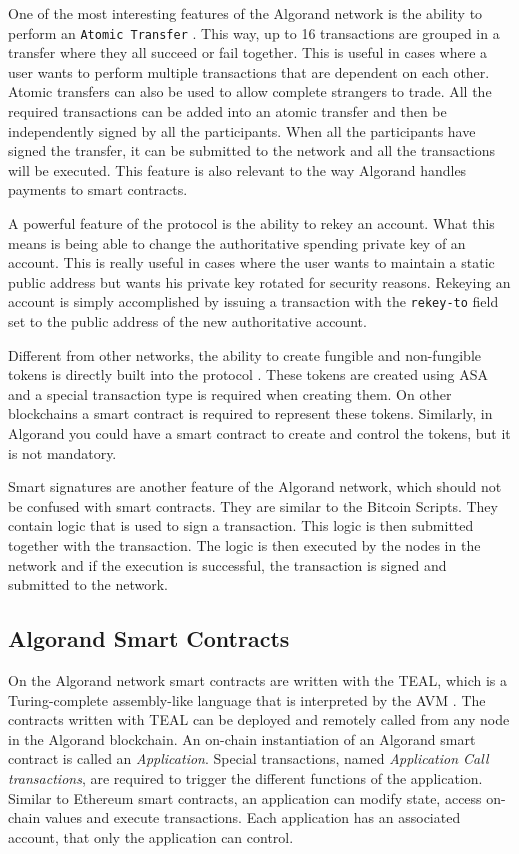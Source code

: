 One of the most interesting features of the Algorand network is the ability to perform an \texttt{Atomic Transfer} \cite{noauthor_atomic_nodate}. This way, up to 16 transactions are grouped in a transfer where they all succeed or fail together. This is useful in cases where a user wants to perform multiple transactions that are dependent on each other. Atomic transfers can also be used to allow complete strangers to trade. All the required transactions can be added into an atomic transfer and then be independently signed by all the participants. When all the participants have signed the transfer, it can be submitted to the network and all the transactions will be executed. This feature is also relevant to the way Algorand handles payments to smart contracts.

A powerful feature of the protocol is the ability to rekey an account. What this means is being able to change the authoritative spending private key of an account. This is really useful in cases where the user wants to maintain a static public address but wants his private key rotated for security reasons. Rekeying an account is simply accomplished by issuing a transaction with the \texttt{rekey-to} field set to the public address of the new authoritative account.

Different from other networks, the ability to create fungible and non-fungible tokens is directly built into the protocol \cite{noauthor_algorand_nodate-4}. These tokens are created using \ac{ASA} and a special transaction type is required when creating them. On other blockchains a smart contract is required to represent these tokens. Similarly, in Algorand you could have a smart contract to create and control the tokens, but it is not mandatory.

Smart signatures are another feature of the Algorand network, which should not be confused with smart contracts. They are similar to the Bitcoin Scripts. They contain logic that is used to sign a transaction. This logic is then submitted together with the transaction. The logic is then executed by the nodes in the network and if the execution is successful, the transaction is signed and submitted to the network.

\subsection*{Algorand Smart Contracts} \label{section:algorand-smartcontracts}
On the Algorand network smart contracts are written with the \ac{TEAL}, which is a Turing-complete assembly-like language that is interpreted by the \ac{AVM} \cite{noauthor_introduction_nodate}. The contracts written with \ac{TEAL} can be deployed and remotely called from any node in the Algorand blockchain. An on-chain instantiation of an Algorand smart contract is called an \textit{Application}. Special transactions, named \textit{Application Call transactions}, are required to trigger the different functions of the application. Similar to Ethereum smart contracts, an application can modify state, access on-chain values and execute transactions. Each application has an associated account, that only the application can control.

